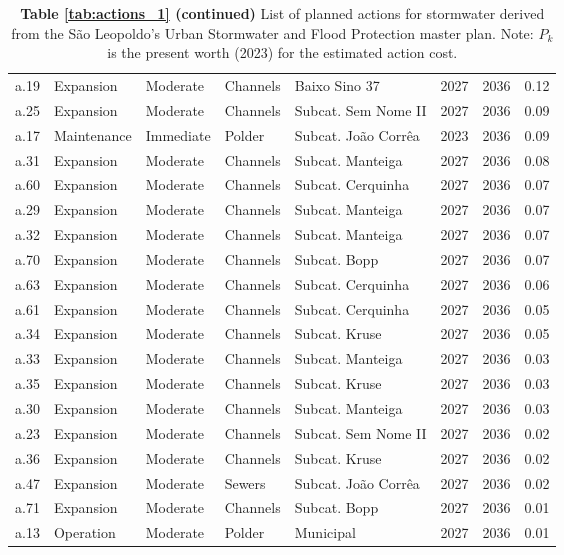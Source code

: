 \documentclass[11pt]{article}
\begin{document}
\begin{table}[h]
\begin{tabular}{lllllrrr}
a.19 &     Expansion &  Moderate & Channels &       Baixo Sino 37 &   2027 & 2036 &  0.12 \\
a.25 &     Expansion &  Moderate & Channels & Subcat. Sem Nome II &   2027 & 2036 &  0.09 \\
a.17 &   Maintenance & Immediate &   Polder & Subcat. João Corrêa &   2023 & 2036 &  0.09 \\
a.31 &     Expansion &  Moderate & Channels &    Subcat. Manteiga &   2027 & 2036 &  0.08 \\
a.60 &     Expansion &  Moderate & Channels &   Subcat. Cerquinha &   2027 & 2036 &  0.07 \\
a.29 &     Expansion &  Moderate & Channels &    Subcat. Manteiga &   2027 & 2036 &  0.07 \\
a.32 &     Expansion &  Moderate & Channels &    Subcat. Manteiga &   2027 & 2036 &  0.07 \\
a.70 &     Expansion &  Moderate & Channels &        Subcat. Bopp &   2027 & 2036 &  0.07 \\
a.63 &     Expansion &  Moderate & Channels &   Subcat. Cerquinha &   2027 & 2036 &  0.06 \\
a.61 &     Expansion &  Moderate & Channels &   Subcat. Cerquinha &   2027 & 2036 &  0.05 \\
a.34 &     Expansion &  Moderate & Channels &       Subcat. Kruse &   2027 & 2036 &  0.05 \\
a.33 &     Expansion &  Moderate & Channels &    Subcat. Manteiga &   2027 & 2036 &  0.03 \\
a.35 &     Expansion &  Moderate & Channels &       Subcat. Kruse &   2027 & 2036 &  0.03 \\
a.30 &     Expansion &  Moderate & Channels &    Subcat. Manteiga &   2027 & 2036 &  0.03 \\
a.23 &     Expansion &  Moderate & Channels & Subcat. Sem Nome II &   2027 & 2036 &  0.02 \\
a.36 &     Expansion &  Moderate & Channels &       Subcat. Kruse &   2027 & 2036 &  0.02 \\
a.47 &     Expansion &  Moderate &   Sewers & Subcat. João Corrêa &   2027 & 2036 &  0.02 \\
a.71 &     Expansion &  Moderate & Channels &        Subcat. Bopp &   2027 & 2036 &  0.01 \\
a.13 &     Operation &  Moderate &   Polder &           Municipal &   2027 & 2036 &  0.01 \\
\bottomrule
\end{tabular}
\caption*{\textbf{Table \ref{tab:actions_1} (continued)} List of planned actions for stormwater derived from the São Leopoldo's Urban Stormwater and Flood Protection master plan. Note: $P_k$ is the present worth (2023) for the estimated action cost.}
\end{table}
\end{document}
